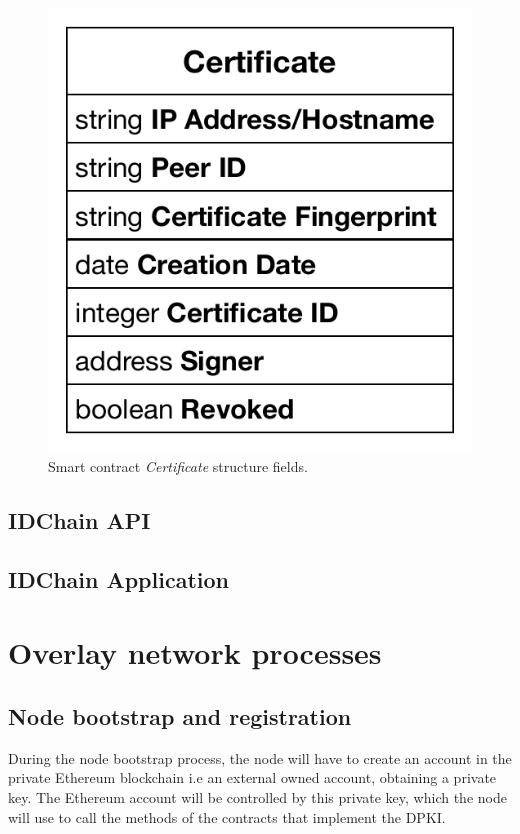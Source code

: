 \begin{figure}
  \includegraphics[width=\linewidth]{Figures/certificate-structure.pdf}
  \caption{Smart contract \textit{Certificate} structure fields.}
  \label{fig:certificate-structure}
\end{figure}

\subsection{IDChain API}

\subsection{IDChain Application}

\section{Overlay network processes}

\subsection{Node bootstrap and registration}
During the node bootstrap process, the node will have to create an account in the private Ethereum blockchain i.e an external owned account, obtaining a private key.
The Ethereum account will be controlled by this private key, which the node will use to call the methods of the contracts that implement the DPKI.

